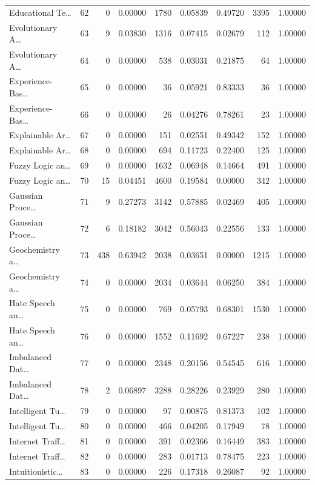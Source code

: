 \begin{table}
\begin{tabular}{lrrrrrrrr}
Educational Te… & 62 & 0 & 0.00000 & 1780 & 0.05839 & 0.49720 & 3395 & 1.00000 \\
Evolutionary A… & 63 & 9 & 0.03830 & 1316 & 0.07415 & 0.02679 & 112 & 1.00000 \\
Evolutionary A… & 64 & 0 & 0.00000 & 538 & 0.03031 & 0.21875 & 64 & 1.00000 \\
Experience-Bas… & 65 & 0 & 0.00000 & 36 & 0.05921 & 0.83333 & 36 & 1.00000 \\
Experience-Bas… & 66 & 0 & 0.00000 & 26 & 0.04276 & 0.78261 & 23 & 1.00000 \\
Explainable Ar… & 67 & 0 & 0.00000 & 151 & 0.02551 & 0.49342 & 152 & 1.00000 \\
Explainable Ar… & 68 & 0 & 0.00000 & 694 & 0.11723 & 0.22400 & 125 & 1.00000 \\
Fuzzy Logic an… & 69 & 0 & 0.00000 & 1632 & 0.06948 & 0.14664 & 491 & 1.00000 \\
Fuzzy Logic an… & 70 & 15 & 0.04451 & 4600 & 0.19584 & 0.00000 & 342 & 1.00000 \\
Gaussian Proce… & 71 & 9 & 0.27273 & 3142 & 0.57885 & 0.02469 & 405 & 1.00000 \\
Gaussian Proce… & 72 & 6 & 0.18182 & 3042 & 0.56043 & 0.22556 & 133 & 1.00000 \\
Geochemistry a… & 73 & 438 & 0.63942 & 2038 & 0.03651 & 0.00000 & 1215 & 1.00000 \\
Geochemistry a… & 74 & 0 & 0.00000 & 2034 & 0.03644 & 0.06250 & 384 & 1.00000 \\
Hate Speech an… & 75 & 0 & 0.00000 & 769 & 0.05793 & 0.68301 & 1530 & 1.00000 \\
Hate Speech an… & 76 & 0 & 0.00000 & 1552 & 0.11692 & 0.67227 & 238 & 1.00000 \\
Imbalanced Dat… & 77 & 0 & 0.00000 & 2348 & 0.20156 & 0.54545 & 616 & 1.00000 \\
Imbalanced Dat… & 78 & 2 & 0.06897 & 3288 & 0.28226 & 0.23929 & 280 & 1.00000 \\
Intelligent Tu… & 79 & 0 & 0.00000 & 97 & 0.00875 & 0.81373 & 102 & 1.00000 \\
Intelligent Tu… & 80 & 0 & 0.00000 & 466 & 0.04205 & 0.17949 & 78 & 1.00000 \\
Internet Traff… & 81 & 0 & 0.00000 & 391 & 0.02366 & 0.16449 & 383 & 1.00000 \\
Internet Traff… & 82 & 0 & 0.00000 & 283 & 0.01713 & 0.78475 & 223 & 1.00000 \\
Intuitionistic… & 83 & 0 & 0.00000 & 226 & 0.17318 & 0.26087 & 92 & 1.00000 \\

\end{tabular}
\end{table}
